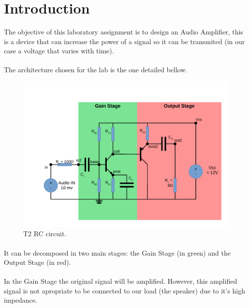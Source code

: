 \section{Introduction}
\label{sec:introduction}

\paragraph{} The objective of this laboratory assignment is to design an Audio Amplifier, this is a device that can increase the power of a signal so it can be transmited (in our case a voltage that varies with time).

\paragraph{} The architecture chosen for the lab is the one detailed bellow.

\begin{figure}[h]
	\centering
	\includegraphics[width=0.9\linewidth]{./Circuit.pdf}
	\caption{T2 RC circuit.}
	\label{fig:rc}
\end{figure}

\paragraph{} It can be decomposed in two main stages: the Gain Stage (in green) and the Output Stage (in red).

\paragraph{} In the Gain Stage the original signal will be amplified. However, this amplified signal is not apropriate to be connected to our load (the speaker) due to it's high impedance.

